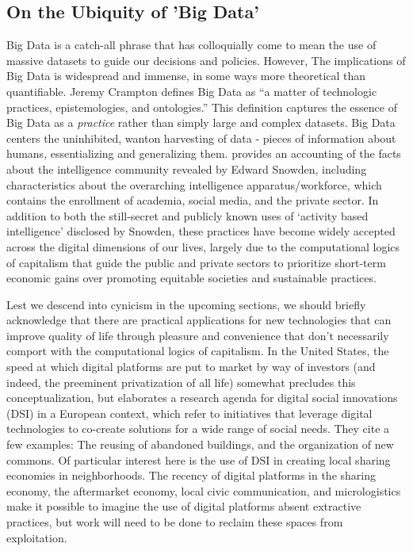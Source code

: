 \subsection{On the Ubiquity of 'Big Data'}
Big Data is a catch-all phrase that has colloquially come to mean the
use of massive datasets to guide our decisions and policies. However,
The implications of Big Data is widespread and immense, in some ways
more theoretical than quantifiable. Jeremy Crampton defines Big Data
as ``a matter of technologic practices, epistemologies, and
ontologies.'' This definition captures the essence of Big Data as
a \emph{practice} rather than simply large and complex datasets. Big
Data centers the uninhibited, wanton harvesting of data - pieces of
information about humans, essentializing and generalizing
them. \cite{crampton2015CollectIt} provides an accounting of the facts
about the intelligence community revealed by Edward Snowden, including
characteristics about the overarching intelligence
apparatus/workforce, which contains the enrollment of academia, social
media, and the private sector. In addition to both the still-secret and
publicly known uses of `activity based intelligence' disclosed by
Snowden, these practices have become widely accepted across the digital
dimensions of our lives, largely due to the computational logics
of capitalism that guide the public and private sectors to prioritize
short-term economic gains over promoting equitable societies and
sustainable practices.

Lest we descend into cynicism in the upcoming sections, we should
briefly acknowledge that there are practical applications for new
technologies that can improve quality of life through pleasure and
convenience that don't necessarily comport with the computational
logics of capitalism. In the United States, the speed at which digital
platforms are put to market by way of investors (and indeed, the
preeminent privatization of all life) somewhat precludes this
conceptualization, but \cite{certoma2020DigitalSocial} elaborates a
research agenda for digital social innovations (DSI) in a European
context, which refer to initiatives that leverage digital technologies
to co-create solutions for a wide range of social needs. They cite a
few examples: The reusing of abandoned buildings, and the organization
of new commons. Of particular interest here is the use of DSI in
creating local sharing economies in neighborhoods. The recency of
digital platforms in the sharing economy, the aftermarket economy,
local civic communication, and micrologistics make it possible to
imagine the use of digital platforms absent extractive practices, but
work will need to be done to reclaim these spaces from exploitation.

